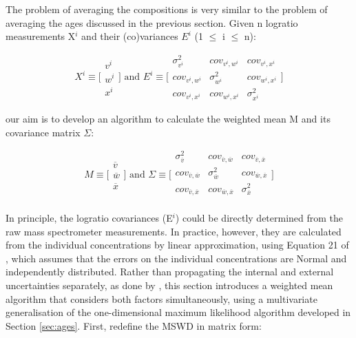\documentclass{article}
\begin{document}
The problem of averaging the compositions is very similar to the
problem of averaging the ages discussed in the previous section.
Given n logratio measurements X$^i$ and their (co)variances $E^i$ (1
$\leq$ i $\leq$ n):

\begin{equation}
X^i \equiv
\Biggl[
\begin{array}{c}
v^i\\
w^i\\
x^i
\end{array}
\Biggr]
\mbox{~and~}
E^i \equiv
\Biggl[
\begin{array}{ccc}
\sigma_{v^i}^{2} & cov_{v^i,w^i} & cov_{v^i,x^i} \\
cov_{v^i,w^i} & \sigma_{w^i}^{2} & cov_{w^i,x^i} \\
cov_{v^i,x^i} & cov_{w^i,x^i} & \sigma_{x^i}^{2}
\end{array}
\Biggr]
\label{eq:Ai}
\end{equation}

\noindent our  aim is to  develop an  algorithm to  calculate the  weighted mean
M and its covariance matrix $\Sigma$:

\begin{equation}
M \equiv
\Biggl[
\begin{array}{c}
\overline{v}\\
\overline{w}\\
\overline{x}
\end{array}
\Biggr]
\mbox{~and~}
\Sigma \equiv
\Biggl[
\begin{array}{ccc}
\sigma^2_{\overline{v}}      & cov_{\overline{v},\overline{w}}   & cov_{\overline{v},\overline{x}}\\
cov_{\overline{v},\overline{w}}  & \sigma^2_{\overline{w}}       & cov_{\overline{w},\overline{x}}\\
cov_{\overline{v},\overline{x}}  & cov_{\overline{w},\overline{x}}   & \sigma^2_{\overline{x}}\\
\end{array}
\Biggr]
\label{eq:Abar}
\end{equation}

In principle, the logratio covariances (E$^i$) could be directly
determined from the raw mass spectrometer measurements. In practice,
however, they are calculated from the individual concentrations by
linear approximation, using Equation 21 of \citet{vermeesch2008a},
which assumes that the errors on the individual concentrations are
Normal and independently distributed.  Rather than propagating the
internal and external uncertainties separately, as done by
\citet{vermeesch2008a}, this section introduces a weighted mean
algorithm that considers both factors simultaneously, using a
multivariate generalisation of the one-dimensional maximum likelihood
algorithm developed in Section \ref{sec:ages}. First, redefine the
MSWD in matrix form:
\end{document}
